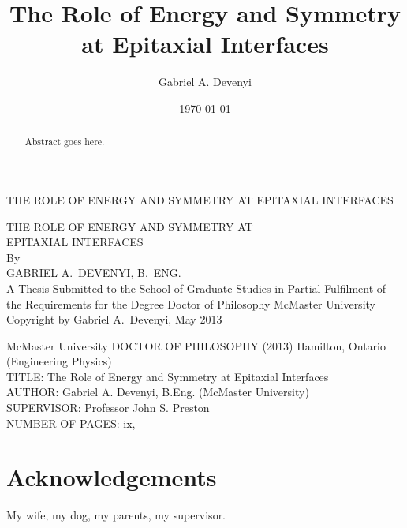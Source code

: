 \documentclass[letterpaper,12pt,twoside]{report}
\title{The Role of Energy and Symmetry at Epitaxial Interfaces}
\author{Gabriel A. Devenyi}
\date{\today}
\begin{document}
\begin{titlepage} %
	\vspace*{\fill}
    \begin{center}{\Large
	THE ROLE OF ENERGY AND SYMMETRY AT EPITAXIAL INTERFACES}
    \end{center}
	\vspace*{\fill}
    \setcounter{page}{0}
\end{titlepage}
\begin{titlepage} %
\centering
\vspace*{\fill} %
{\Large THE ROLE OF ENERGY AND SYMMETRY AT\\
EPITAXIAL INTERFACES\\
By\\GABRIEL A.\ DEVENYI, B.\ ENG.\\}
\vfill
A Thesis Submitted to the School of Graduate Studies in Partial Fulfilment of 
the Requirements for the Degree Doctor of Philosophy
McMaster University
\vfill%
\textcopyright{} Copyright by Gabriel A.\ Devenyi, May 2013
\end{titlepage}
{\noindent McMaster University DOCTOR OF PHILOSOPHY (2013) Hamilton, Ontario (Engineering Physics)\\ 
TITLE: The Role of Energy and Symmetry at Epitaxial Interfaces\\
AUTHOR: Gabriel A. Devenyi, B.Eng. (McMaster University)\\
SUPERVISOR: Professor John S. Preston\\
NUMBER OF PAGES: ix,~\pageref{LastPage}}
	\begin{abstract}
		\thispagestyle{plain}
		\setcounter{page}{3}
			Abstract goes here.
	\end{abstract}
	\setcounter{page}{4}
	\chapter*{Acknowledgements}
	My wife, my dog, my parents, my supervisor.
	\newpage

	\tableofcontents
	\listoffigures
    \listoftodos
	\clearpage
\end{document}
